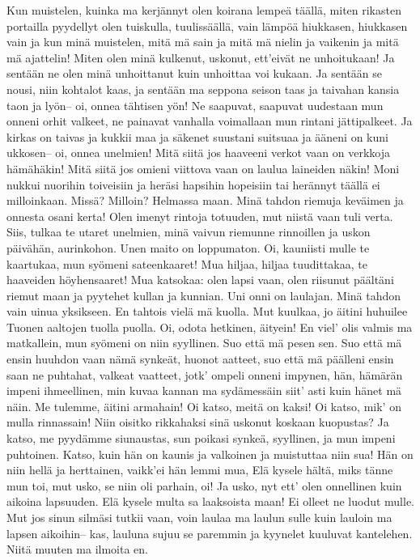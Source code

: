 Kun muistelen, kuinka ma kerjännyt
olen koirana lempeä täällä,
miten rikasten portailla pyydellyt
olen tuiskulla, tuulissäällä,
vain lämpöä hiukkasen, hiukkasen vain
ja kun minä muistelen, mitä mä sain
ja mitä mä nielin ja vaikenin
ja mitä mä ajattelin!
\endverse
\beginverse
Miten olen minä kulkenut, uskonut,
ett'eivät ne unhoitukaan!
Ja sentään ne olen minä unhoittanut
kuin unhoittaa voi kukaan.
Ja sentään se nousi, niin kohtalot kaas,
ja sentään ma seppona seison taas
ja taivahan kansia taon ja lyön--
oi, onnea tähtisen yön!
\endverse
\beginverse
Ne saapuvat, saapuvat uudestaan
mun onneni orhit valkeet,
ne painavat vanhalla voimallaan
mun rintani jättipalkeet.
Ja kirkas on taivas ja kukkii maa
ja säkenet suustani suitsuaa
ja ääneni on kuni ukkosen--
oi, onnea unelmien!
\endverse
\beginverse
Mitä siitä jos haaveeni verkot vaan
on verkkoja hämähäkin!
Mitä siitä jos omieni viittova vaan
on laulua laineiden näkin!
Moni nukkui nuorihin toiveisiin
ja heräsi hapsihin hopeisiin
tai herännyt täällä ei milloinkaan.
Missä? Milloin? Helmassa maan.
Minä tahdon riemuja keväimen
ja onnesta osani kerta!
Olen imenyt rintoja totuuden,
mut niistä vaan tuli verta.
Siis, tulkaa te utaret unelmien,
minä vaivun riemunne rinnoillen
ja uskon päivähän, aurinkohon.
Unen maito on loppumaton.
\endverse
\beginverse
Oi, kauniisti mulle te kaartukaa,
mun syömeni sateenkaaret!
Mua hiljaa, hiljaa tuudittakaa,
te haaveiden höyhensaaret!
Mua katsokaa: olen lapsi vaan,
olen riisunut päältäni riemut maan
ja pyytehet kullan ja kunnian.
Uni onni on laulajan.
\endverse
\beginverse
Minä tahdon vain uinua yksikseen.
En tahtois vielä mä kuolla.
Mut kuulkaa, jo äitini huhuilee
Tuonen aaltojen tuolla puolla.
Oi, odota hetkinen, äityein!
En viel' olis valmis ma matkallein,
mun syömeni on niin syyllinen.
Suo että mä pesen sen.
\endverse
\beginverse
Suo että mä ensin huuhdon vaan
nämä synkeät, huonot aatteet,
suo että mä päälleni ensin saan
ne puhtahat, valkeat vaatteet,
jotk' ompeli onneni impynen,
hän, hämärän impeni ihmeellinen,
min kuvaa kannan ma sydämessäin
siit' asti kuin hänet mä näin.
\endverse
\beginverse
Me tulemme, äitini armahain!
Oi katso, meitä on kaksi!
Oi katso, mik' on mulla rinnassain!
Niin oisitko rikkahaksi
sinä uskonut koskaan kuopustas?
Ja katso, me pyydämme siunaustas,
sun poikasi synkeä, syyllinen,
ja mun impeni puhtoinen.
\endverse
\beginverse
Katso, kuin hän on kaunis ja valkoinen
ja muistuttaa niin sua!
Hän on niin hellä ja herttainen,
vaikk'ei hän lemmi mua,
Elä kysele hältä, miks tänne mun toi,
mut usko, se niin oli parhain, oi!
Ja usko, nyt ett' olen onnellinen
kuin aikoina lapsuuden.
\endverse
\beginverse
Elä kysele multa sa laaksoista maan!
Ei olleet ne luodut mulle.
Mut jos sinun silmäsi tutkii vaan,
voin laulaa ma laulun sulle
kuin lauloin ma lapsen aikoihin--
kas, lauluna sujuu se paremmin
ja kyynelet kuuluvat kantelehen.
Niitä muuten ma ilmoita en.
\endverse


